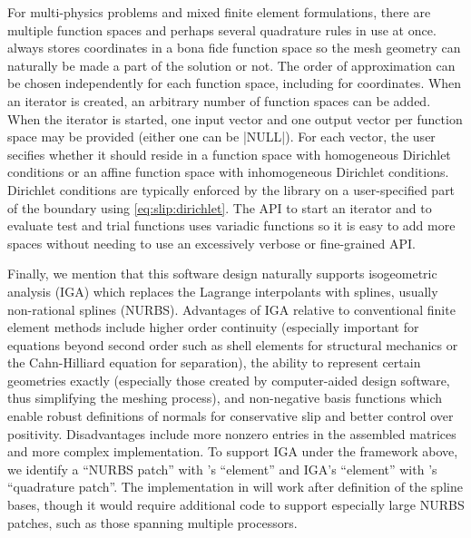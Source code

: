 For multi-physics problems and mixed finite element formulations, there are multiple function spaces and perhaps several quadrature rules in use at once.
{\Dohp} always stores coordinates in a bona fide function space so the mesh geometry can naturally be made a part of the solution or not.
The order of approximation can be chosen independently for each function space, including for coordinates.
When an iterator is created, an arbitrary number of function spaces can be added.
When the iterator is started, one input vector and one output vector per function space may be provided (either one can be \cverb|NULL|).
For each vector, the user secifies whether it should reside in a function space with homogeneous Dirichlet conditions or an affine function space with inhomogeneous Dirichlet conditions.
Dirichlet conditions are typically enforced by the library on a user-specified part of the boundary using \eqref{eq:slip:dirichlet}.
The API to start an iterator and to evaluate test and trial functions uses variadic functions so it is easy to add more spaces without needing to use an excessively verbose or fine-grained API.

Finally, we mention that this software design naturally supports isogeometric analysis (IGA) \cite{cottrell2009isogeometric} which replaces the Lagrange interpolants with splines, usually non-rational splines (NURBS).
Advantages of IGA relative to conventional finite element methods include higher order continuity (especially important for equations beyond second order such as shell elements for structural mechanics or the Cahn-Hilliard equation for separation), the ability to represent certain geometries exactly (especially those created by computer-aided design software, thus simplifying the meshing process), and non-negative basis functions which enable robust definitions of normals for conservative slip and better control over positivity.
Disadvantages include more nonzero entries in the assembled matrices and more complex implementation.
To support IGA under the framework above, we identify a ``NURBS patch'' with \Dohp's ``element'' and IGA's ``element'' with \Dohp's ``quadrature patch''.
The implementation in {\Dohp} will work after definition of the spline bases, though it would require additional code to support especially large NURBS patches, such as those spanning multiple processors.

